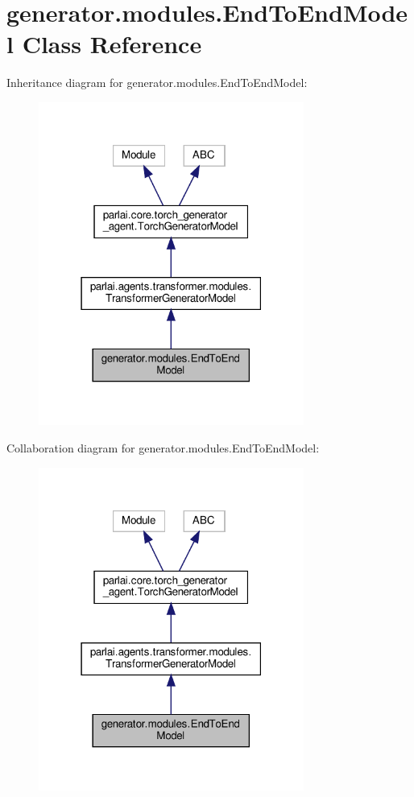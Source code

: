 \hypertarget{classgenerator_1_1modules_1_1EndToEndModel}{}\section{generator.\+modules.\+End\+To\+End\+Model Class Reference}
\label{classgenerator_1_1modules_1_1EndToEndModel}


Inheritance diagram for generator.\+modules.\+End\+To\+End\+Model\+:
\nopagebreak
\begin{figure}[H]
\begin{center}
\leavevmode
\includegraphics[width=247pt]{classgenerator_1_1modules_1_1EndToEndModel__inherit__graph}
\end{center}
\end{figure}


Collaboration diagram for generator.\+modules.\+End\+To\+End\+Model\+:
\nopagebreak
\begin{figure}[H]
\begin{center}
\leavevmode
\includegraphics[width=247pt]{classgenerator_1_1modules_1_1EndToEndModel__coll__graph}
\end{center}
\end{figure}
